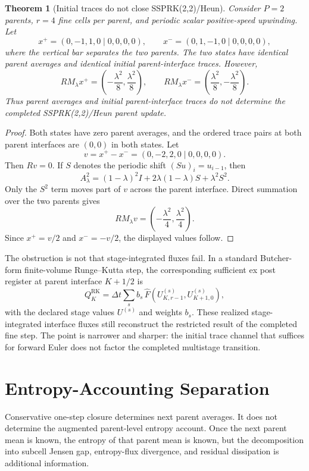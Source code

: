 \documentclass[a4paper,fleqn, sort&compress]{cas-sc}
\newtheorem{theorem}{Theorem}[section]
\theoremstyle{remark}
\theoremstyle{definition}
\begin{document}
\begin{theorem}[Initial traces do not close SSPRK(2,2)/Heun]
\label{thm:heuntrace}
Consider \(P=2\) parents, \(r=4\) fine cells per parent, and periodic scalar
positive-speed upwinding.  Let
\[
  x^+=(0,-1,1,0\mid 0,0,0,0),
  \qquad
  x^-=(0,1,-1,0\mid 0,0,0,0),
\]
where the vertical bar separates the two parents.  The two states have
identical parent averages and identical initial parent-interface traces.
However,
\[
  R M_\lambda x^+
  =
  \left(-\frac{\lambda^2}{8},\frac{\lambda^2}{8}\right),
  \qquad
  R M_\lambda x^-
  =
  \left(\frac{\lambda^2}{8},-\frac{\lambda^2}{8}\right).
\]
Thus parent averages and initial parent-interface traces do not determine
the completed SSPRK(2,2)/Heun parent update.
\end{theorem}

\begin{proof}
Both states have zero parent averages, and the ordered trace pairs at both
parent interfaces are \((0,0)\) in both states.  Let
\[
  v=x^+-x^-=(0,-2,2,0\mid 0,0,0,0).
\]
Then \(Rv=0\).  If \(S\) denotes the periodic shift \((Su)_i=u_{i-1}\), then
\[
  A_\lambda^2
  =
  (1-\lambda)^2I
  +
  2\lambda(1-\lambda)S
  +
  \lambda^2S^2.
\]
Only the \(S^2\) term moves part of \(v\) across the parent interface.
Direct summation over the two parents gives
\[
  R M_\lambda v
  =
  \left(-\frac{\lambda^2}{4},\frac{\lambda^2}{4}\right).
\]
Since \(x^+=v/2\) and \(x^-=-v/2\), the displayed values follow.
\end{proof}

The obstruction is not that stage-integrated fluxes fail.  In a standard
Butcher-form finite-volume Runge--Kutta step, the corresponding sufficient
ex post register at parent interface \(K+1/2\) is
\[
  Q_K^{\mathrm{RK}}
  =
  \Delta t
  \sum_s b_s\,
  \widehat F\left(
    U_{K,r-1}^{(s)},U_{K+1,0}^{(s)}
  \right),
\]
with the declared stage values \(U^{(s)}\) and weights \(b_s\).  These
realized stage-integrated interface fluxes still reconstruct the restricted
result of the completed fine step.  The point is narrower and sharper: the
initial trace channel that suffices for forward Euler does not factor the
completed multistage transition.

\section{Entropy-Accounting Separation}
\label{sec:entropy}

Conservative one-step closure determines next parent averages.  It does not
determine the augmented parent-level entropy account.  Once the next parent
mean is known, the entropy of that parent mean is known, but the decomposition
into subcell Jensen gap, entropy-flux divergence, and residual dissipation is
additional information.
\end{document}
